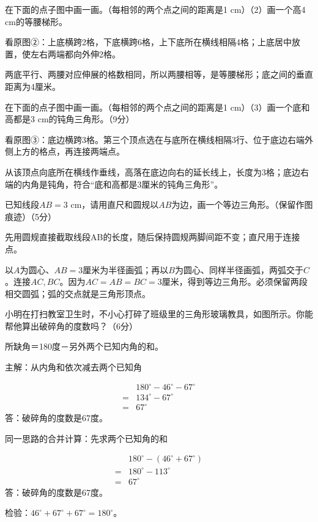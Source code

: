 在下面的点子图中画一画。（每相邻的两个点之间的距离是1 cm）（2）画一个高4 cm的等腰梯形。\par
{}
\begin{BookAnswer}
看原图②：上底横跨2格，下底横跨6格，上下底所在横线相隔4格；上底居中放置，使左右两端都向外伸2格。\par 两底平行、两腰对应伸展的格数相同，所以两腰相等，是等腰梯形；底之间的垂直距离为4厘米。
\end{BookAnswer}

在下面的点子图中画一画。（每相邻的两个点之间的距离是1 cm）（3）画一个底和高都是3 cm的钝角三角形。（9分）\par
{}
\begin{BookAnswer}
看原图③：底边横跨3格。第三个顶点选在与底所在横线相隔3行、位于底边右端外侧上方的格点，再连接两端点。\par 从该顶点向底所在横线作垂线，高落在底边向右的延长线上，长度为3格；底边右端的内角是钝角，符合“底和高都是3厘米的钝角三角形”。
\end{BookAnswer}

已知线段\(AB=3\text{ cm}\)，请用直尺和圆规以\(AB\)为边，画一个等边三角形。（保留作图痕迹）（5分）\par
{}
\begin{BookAnswer}
先用圆规直接截取线段AB的长度，随后保持圆规两脚间距不变；直尺用于连接点。\par 以\(A\)为圆心、\(AB=3\)厘米为半径画弧；再以\(B\)为圆心、同样半径画弧，两弧交于\(C\)。连接\(AC,BC\)。因为\(AC=AB=BC=3\)厘米，得到等边三角形。必须保留两段相交圆弧；弧的交点就是三角形顶点。
\end{BookAnswer}

小明在打扫教室卫生时，不小心打碎了班级里的三角形玻璃教具，如图所示。你能帮他算出破碎角的度数吗？（6分）\par
{}
\begin{BookAnswer}
所缺角＝180度－另外两个已知内角的和。\par 主解：从内角和依次减去两个已知角\par \[\begin{aligned} &180^\circ-46^\circ-67^\circ\\={}&134^\circ-67^\circ\\={}&67^\circ\end{aligned}\]答：破碎角的度数是67度。\par 同一思路的合并计算：先求两个已知角的和\par \[\begin{aligned} &180^\circ-(46^\circ+67^\circ)\\={}&180^\circ-113^\circ\\={}&67^\circ\end{aligned}\]答：破碎角的度数是67度。\par 检验：\(46^\circ+67^\circ+67^\circ=180^\circ\)。
\end{BookAnswer}

